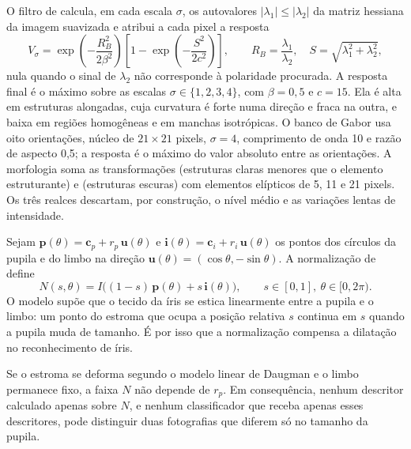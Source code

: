 O filtro de \citet{Frangi1998} calcula, em cada escala $\sigma$, os
autovalores $|\lambda_1|\le|\lambda_2|$ da matriz hessiana da imagem suavizada
e atribui a cada pixel a resposta
\begin{equation}
  V_\sigma = \exp\!\left(-\frac{R_B^2}{2\beta^2}\right)
  \left[1-\exp\!\left(-\frac{S^2}{2c^2}\right)\right],
  \qquad R_B=\frac{\lambda_1}{\lambda_2},\quad S=\sqrt{\lambda_1^2+\lambda_2^2},
\end{equation}
nula quando o sinal de $\lambda_2$ não corresponde à polaridade procurada. A
resposta final é o máximo sobre as escalas $\sigma\in\{1,2,3,4\}$, com
$\beta=0{,}5$ e $c=15$. Ela é alta em estruturas alongadas, cuja curvatura é
forte numa direção e fraca na outra, e baixa em regiões homogêneas e em
manchas isotrópicas. O banco de Gabor usa oito orientações, núcleo de
$21\times21$ pixels, $\sigma=4$, comprimento de onda 10 e razão de aspecto
0,5; a resposta é o máximo do valor absoluto entre as orientações. A
morfologia soma as transformações \tht{} (estruturas claras menores que o
elemento estruturante) e \bh{} (estruturas escuras) com elementos
elípticos de 5, 11 e 21 pixels. Os três realces descartam, por construção,
o nível médio e as variações lentas de intensidade.

\label{sec:invariancia}

Sejam $\mathbf{p}(\theta)=\mathbf{c}_p+r_p\,\mathbf{u}(\theta)$ e
$\mathbf{i}(\theta)=\mathbf{c}_i+r_i\,\mathbf{u}(\theta)$ os pontos dos
círculos da pupila e do limbo na direção
$\mathbf{u}(\theta)=(\cos\theta,-\sin\theta)$. A normalização de
\citet{Daugman2004} define
\begin{equation}
  N(s,\theta)=I\big((1-s)\,\mathbf{p}(\theta)+s\,\mathbf{i}(\theta)\big),
  \qquad s\in[0,1],\ \theta\in[0,2\pi).
  \label{eq:rubber}
\end{equation}
O modelo supõe que o tecido da íris se estica linearmente entre a pupila e o
limbo: um ponto do estroma que ocupa a posição relativa $s$ continua em $s$
quando a pupila muda de tamanho. É por isso que a normalização compensa a
dilatação no reconhecimento de íris.

\begin{proposicao}\label{prop:invariancia}
Se o estroma se deforma segundo o modelo linear de Daugman e o limbo
permanece fixo, a faixa $N$ não depende de $r_p$. Em consequência, nenhum
descritor calculado apenas sobre $N$, e nenhum classificador que receba
apenas esses descritores, pode distinguir duas fotografias que diferem só no
tamanho da pupila.
\end{proposicao}

